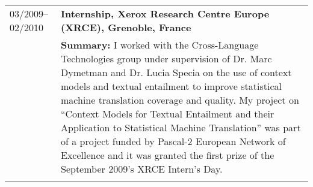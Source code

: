 \begin{tabular}{p{2.92cm}  p{13cm}}
03/2009--02/2010	& \bf Internship, Xerox Research Centre Europe (XRCE), Grenoble, France \\
	& {\bf Summary:} I worked with the Cross-Language Technologies group under supervision of Dr. Marc Dymetman and Dr. Lucia Specia on the use of context models and textual entailment to improve statistical machine translation coverage and quality. My project on ``Context Models for Textual Entailment and their Application to Statistical Machine Translation'' was part of a project funded by Pascal-2 European Network of Excellence  and it was granted the first prize of the September 2009's XRCE Intern's Day. \\
	& \\
\end{tabular}
